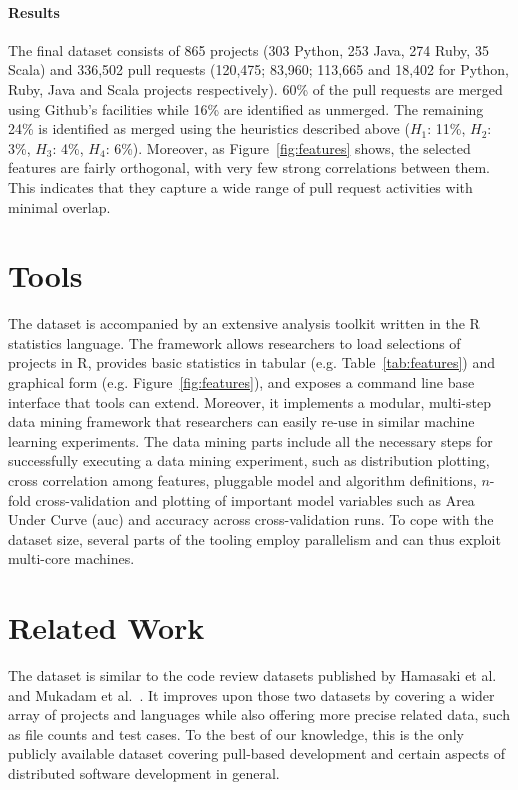\documentclass{sig-alternate}
\begin{document}
\paragraph*{Results} The final dataset consists of 865 projects (303 Python, 253 Java, 274 Ruby, 35 Scala) and 336,502 pull requests (120,475; 83,960; 113,665 and 18,402 for Python,
Ruby, Java and Scala projects respectively). 60\% of the pull requests are
merged using Github's facilities while 16\% are identified as unmerged.
The remaining 24\% is identified as merged using the heuristics described
above ($H_1$: 11\%, $H_2$: 3\%, $H_3$: 4\%, $H_4$: 6\%).
Moreover, as Figure~\ref{fig:features} shows,
the selected features are fairly orthogonal, with very few strong correlations
between them. This indicates that they capture a wide range of pull
request activities with minimal overlap.

\section{Tools}

The \pullreqs dataset is accompanied by an extensive analysis toolkit written in
the R statistics language. The framework allows researchers to load selections
of projects in R, provides basic statistics in tabular (e.g.
Table~\ref{tab:features}) and graphical form (e.g. Figure~\ref{fig:features}),
and exposes a command line base interface that tools can extend. Moreover,
it implements a modular, multi-step data mining framework that researchers
can easily re-use in similar machine learning experiments. The data mining
parts include all the necessary steps for successfully executing a data mining
experiment, such as distribution plotting, cross correlation among features,
pluggable model and algorithm definitions, $n$-fold cross-validation and
plotting of important model variables such as Area Under Curve ({\sc auc}) and
accuracy across cross-validation runs. To cope with the \pullreqs dataset
size, several parts of the tooling employ parallelism and can thus exploit
multi-core machines.

\section{Related Work}
\label{sec:rel}

The \pullreqs dataset is similar to the code review datasets published by
Hamasaki et al.~\cite{Hamas13} and Mukadam et al.~\cite{Mukad13}.  It improves
upon those two datasets by covering a wider array of projects and languages
while also offering more precise related data, such as file counts and test
cases. To the best of our knowledge, this is the only publicly available
dataset covering pull-based development and certain aspects of distributed
software development in general.
\end{document}
